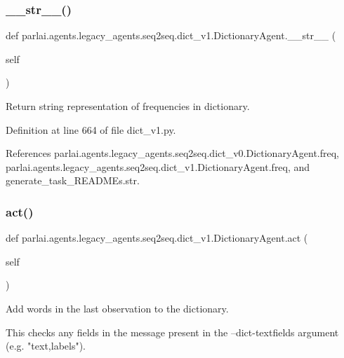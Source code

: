 \subsubsection{\texorpdfstring{\+\_\+\+\_\+str\+\_\+\+\_\+()}{\_\_str\_\_()}}
{\footnotesize\ttfamily def parlai.\+agents.\+legacy\+\_\+agents.\+seq2seq.\+dict\+\_\+v1.\+Dictionary\+Agent.\+\_\+\+\_\+str\+\_\+\+\_\+ (\begin{DoxyParamCaption}\item[{}]{self }\end{DoxyParamCaption})}

\begin{DoxyVerb}Return string representation of frequencies in dictionary.\end{DoxyVerb}
 

Definition at line 664 of file dict\+\_\+v1.\+py.



References parlai.\+agents.\+legacy\+\_\+agents.\+seq2seq.\+dict\+\_\+v0.\+Dictionary\+Agent.\+freq, parlai.\+agents.\+legacy\+\_\+agents.\+seq2seq.\+dict\+\_\+v1.\+Dictionary\+Agent.\+freq, and generate\+\_\+task\+\_\+\+R\+E\+A\+D\+M\+Es.\+str.

\mbox{\label{classparlai_1_1agents_1_1legacy__agents_1_1seq2seq_1_1dict__v1_1_1DictionaryAgent_a46c77fca1e6062b363ed8ee402d46986}} 
\subsubsection{\texorpdfstring{act()}{act()}}
{\footnotesize\ttfamily def parlai.\+agents.\+legacy\+\_\+agents.\+seq2seq.\+dict\+\_\+v1.\+Dictionary\+Agent.\+act (\begin{DoxyParamCaption}\item[{}]{self }\end{DoxyParamCaption})}

\begin{DoxyVerb}Add words in the last observation to the dictionary.

This checks any fields in the message present in the --dict-textfields
argument (e.g. "text,labels").
\end{DoxyVerb}
 


